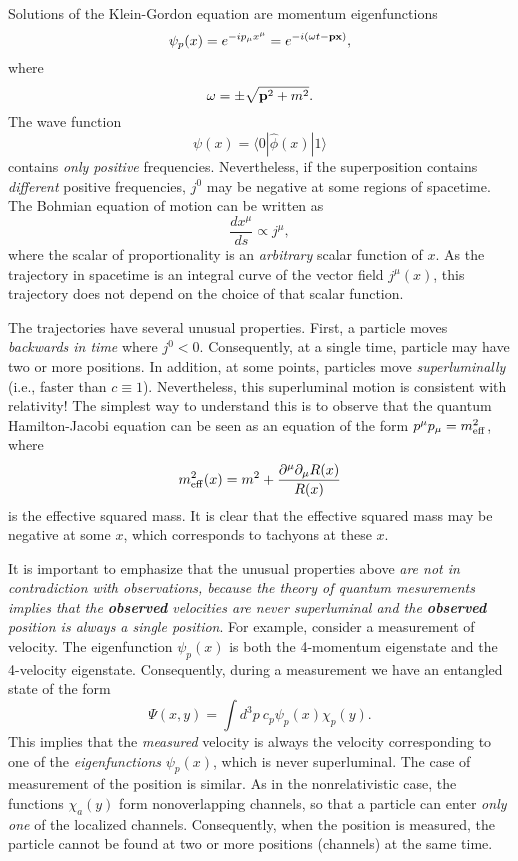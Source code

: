 \documentclass[10pt,twoside]{aipproc} %
\begin{document}
Solutions of the Klein-Gordon equation are momentum eigenfunctions
\begin{equation}
\psi_{p}(x)=e^{-ip_{\mu}x^{\mu}}=e^{-i(\omega t-{\bf p}{\bf x})} ,
\end{equation}
where
\begin{equation}
\omega=\pm\sqrt{{\bf p}^2+m^2} .
\end{equation}
The wave function 
\begin{equation}
\psi(x)=\langle 0|\hat{\phi}(x)|1\rangle
\end{equation}
contains {\em only positive} frequencies. Nevertheless, 
if the superposition contains {\em different} positive frequencies,
$j^0$ may be negative at some regions of spacetime.
The Bohmian equation of motion can be written as 
\begin{equation}
\frac{dx^{\mu}}{ds} \propto j^{\mu} ,
\end{equation}
where the scalar of proportionality is an {\em arbitrary} 
scalar function of $x$. As the trajectory in spacetime is an 
integral curve of the vector field $j^{\mu}(x)$, this trajectory 
does not depend on the choice of that scalar function. 

The trajectories have several 
unusual properties. First, 
a particle moves {\em backwards in time} where $j^0<0$. 
Consequently, at a single time, particle may have two or more positions. 
In addition, at some points, particles move {\em superluminally}
(i.e., faster than $c\equiv 1$).
Nevertheless, this superluminal motion is consistent with 
relativity! The simplest way to understand this is to observe 
that the quantum Hamilton-Jacobi equation can be seen as an
equation of the form $p^{\mu}p_{\mu}=m^2_{\rm eff}$, where 
\begin{equation}
m^2_{\rm eff}(x)=m^2+
\frac{\partial^{\mu}\partial_{\mu} R(x)}{R(x)} 
\end{equation}
is the effective squared mass. It is clear that the effective
squared mass may be negative at some $x$, which corresponds to tachyons
at these $x$.

It is important to emphasize that the unusual properties above 
{\em are not in contradiction with observations, 
because the theory of quantum mesurements implies that the {\bf observed} 
velocities are never superluminal and the {\bf observed} position is 
always a single position}. 
For example, consider a measurement of velocity. The eigenfunction 
$\psi_{p}(x)$ is both the 4-momentum eigenstate and the
4-velocity eigenstate. Consequently, during a measurement we have 
an entangled state of the form
\begin{equation}
\Psi(x,y)=\int d^3p\: c_p\psi_p(x)\chi_p(y) .
\end{equation}
This implies that the {\em measured} velocity is always the velocity 
corresponding to one of the {\em eigenfunctions} $\psi_p(x)$, 
which is never superluminal. 
The case of measurement of the position is similar. As in the 
nonrelativistic case, the functions $\chi_a(y)$ form nonoverlapping
channels, so that a 
particle can enter {\em only one} of the localized channels. Consequently, 
when the position is measured, the particle cannot be found at two 
or more positions (channels) at the same time. 
\end{document}
